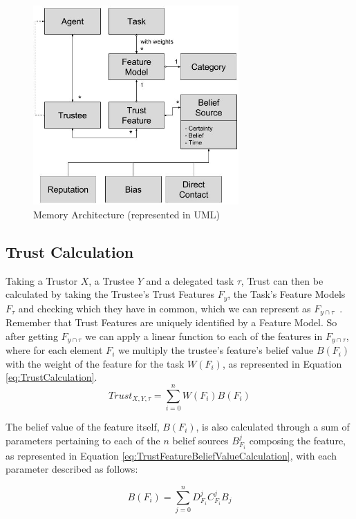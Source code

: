 \begin{figure}[hbt]
    \centering
    \includegraphics[width=0.7\textwidth]{figures/TrustMemoryDiagram.jpg}
    \caption{Memory Architecture (represented in UML)}
    \label{fig:MemoryArchitecture}
\end{figure}


\subsection{Trust Calculation}
Taking a Trustor $X$, a Trustee $Y$ and a delegated task $\tau$, Trust can then be calculated by taking the Trustee's Trust Features $F_y$, the Task's Feature Models $F_\tau$ and checking which they have in common, which we can represent as $F_{y\cap\tau}$~. Remember that Trust Features are uniquely identified by a Feature Model. So after getting $F_{y\cap\tau}$ we can apply a linear function to each of the features in $F_{y\cap\tau}$, where for each element $F_i$ we multiply the trustee's feature's belief value $B(F_i)$ with the weight of the feature for the task $W(F_i)$, as represented in Equation \ref{eq:TrustCalculation}.
\begin{equation}
Trust_{X,Y,\tau}=\sum_{i=0}^{n}W(F_i) B(F_i)
\label{eq:TrustCalculation}
\end{equation}

The belief value of the feature itself, $B(F_i)$, is also calculated through a sum of parameters pertaining to each of the $n$ belief sources $B_{F_i}^j$ composing the feature, as represented in Equation \ref{eq:TrustFeatureBeliefValueCalculation}, with each parameter described as follows: 

\begin{equation}
B(F_i) = \sum_{j=0}^{n} D^j_{F_i} C^j_{F_i} B_j 
\label{eq:TrustFeatureBeliefValueCalculation}
\end{equation}


